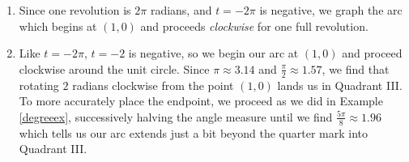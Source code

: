 \documentclass{ximera}
\begin{document}
\begin{example}
\begin{explanation}
\begin{enumerate}
\begin{image}

\end{image}

\item Since one revolution is $2\pi$ radians, and $t=-2\pi$ is negative, we graph  the arc which begins at $(1,0)$ and proceeds \textit{clockwise} for one full revolution.

\begin{image}

\end{image}

\item Like $t=-2\pi$, $t=-2$ is negative, so we begin our arc at $(1,0)$ and proceed clockwise around the unit circle.  Since $\pi \approx 3.14$ and  $\frac{\pi}{2} \approx 1.57$, we find that rotating $2$ radians clockwise from the point $(1,0)$ lands us in Quadrant III.  To more accurately place the endpoint, we proceed as we did in Example \ref{degreeex}, successively halving the angle measure until we find $\frac{5 \pi}{8} \approx 1.96$ which tells us our arc extends just a bit beyond the quarter mark into Quadrant III.


\end{enumerate}
\end{explanation}
\end{example}
\end{document}
